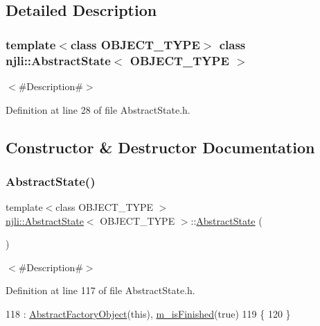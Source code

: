 \subsection{Detailed Description}
\subsubsection*{template$<$class O\+B\+J\+E\+C\+T\+\_\+\+T\+Y\+PE$>$\newline
class njli\+::\+Abstract\+State$<$ O\+B\+J\+E\+C\+T\+\_\+\+T\+Y\+P\+E $>$}

$<$\#\+Description\#$>$ 

Definition at line 28 of file Abstract\+State.\+h.



\subsection{Constructor \& Destructor Documentation}
\mbox{\label{classnjli_1_1_abstract_state_a22638b01fb13e4e7920071d1c3935622}} 
\subsubsection{\texorpdfstring{Abstract\+State()}{AbstractState()}\hspace{0.1cm}{\footnotesize\ttfamily [1/3]}}
{\footnotesize\ttfamily template$<$class O\+B\+J\+E\+C\+T\+\_\+\+T\+Y\+PE $>$ \\
\mbox{\hyperlink{classnjli_1_1_abstract_state}{njli\+::\+Abstract\+State}}$<$ O\+B\+J\+E\+C\+T\+\_\+\+T\+Y\+PE $>$\+::\mbox{\hyperlink{classnjli_1_1_abstract_state}{Abstract\+State}} (\begin{DoxyParamCaption}{ }\end{DoxyParamCaption})}

$<$\#\+Description\#$>$ 

Definition at line 117 of file Abstract\+State.\+h.


\begin{DoxyCode}
118       : \mbox{\hyperlink{classnjli_1_1_abstract_factory_object_a4f7ae7bf09c7c9426e7d6023f7fd8dec}{AbstractFactoryObject}}(\textcolor{keyword}{this}), \mbox{\hyperlink{classnjli_1_1_abstract_state_a445a5d1ac7572b8b01b81937c89e960c}{m\_isFinished}}(\textcolor{keyword}{true})
119   \{
120   \}
\end{DoxyCode}
\mbox{\label{classnjli_1_1_abstract_state_ad576862504904cabe58e872e316916b6}} 
